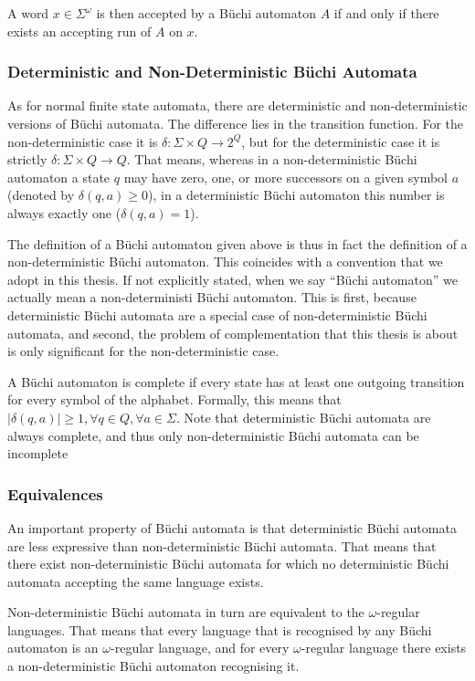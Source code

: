 \documentclass{scrreprt}
\newcommand{\om}{{$\omega$}}
\begin{document}
A word $x \in \Sigma^\omega$ is then accepted by a Büchi automaton $A$ if and only if there exists an accepting run of $A$ on $x$.

\subsubsection{Deterministic and Non-Deterministic Büchi Automata}
As for normal finite state automata, there are deterministic and non-deterministic versions of Büchi automata. The difference lies in the transition function. For the non-deterministic case it is $\delta: \Sigma \times Q \rightarrow 2^Q$, but for the deterministic case it is strictly $\delta: \Sigma \times Q \rightarrow Q$. That means, whereas in a non-deterministic Büchi automaton a state $q$ may have zero, one, or more successors on a given symbol $a$ (denoted by $\delta(q,a) \geq 0$), in a deterministic Büchi automaton this number is always exactly one ($\delta(q,a) = 1$).

The definition of a Büchi automaton given above is thus in fact the definition of a non-deterministic Büchi automaton. This coincides with a convention that we adopt in this thesis. If not explicitly stated, when we say ``Büchi automaton'' we actually mean a non-deterministi Büchi automaton. This is first, because deterministic Büchi automata are a special case of non-deterministic Büchi automata, and second, the problem of complementation that this thesis is about is only significant for the non-deterministic case.

A Büchi automaton is complete if every state has at least one outgoing transition for every symbol of the alphabet. Formally, this means that $|\delta(q,a)| \geq 1, \forall q \in Q, \forall a \in \Sigma$. Note that deterministic Büchi automata are always complete, and thus only non-deterministic Büchi automata can be incomplete

\subsubsection{Equivalences}
An important property of Büchi automata is that deterministic Büchi automata are less expressive than non-deterministic Büchi automata. That means that there exist non-deterministic Büchi automata for which no deterministic Büchi automata accepting the same language exists.

Non-deterministic Büchi automata in turn are equivalent to the \om-regular languages. That means that every language that is recognised by any Büchi automaton is an \om-regular language, and for every \om-regular language there exists a non-deterministic Büchi automaton recognising it.
\end{document}
